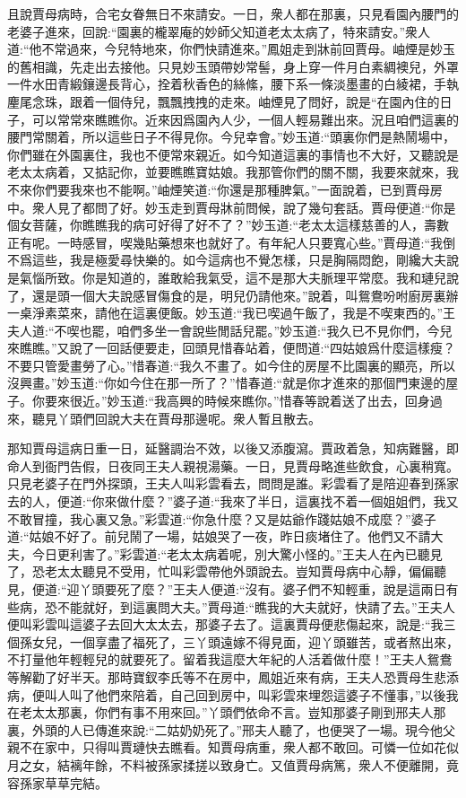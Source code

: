 \begin{parag}
    且說賈母病時，合宅女眷無日不來請安。一日，衆人都在那裏，只見看園內腰門的老婆子進來，回說:“園裏的櫳翠庵的妙師父知道老太太病了，特來請安。”衆人道:“他不常過來，今兒特地來，你們快請進來。”鳳姐走到牀前回賈母。岫煙是妙玉的舊相識，先走出去接他。只見妙玉頭帶妙常髻，身上穿一件月白素綢襖兒，外罩一件水田青緞鑲邊長背心，拴着秋香色的絲絛，腰下系一條淡墨畫的白綾裙，手執麈尾念珠，跟着一個侍兒，飄飄拽拽的走來。岫煙見了問好，說是“在園內住的日子，可以常常來瞧瞧你。近來因爲園內人少，一個人輕易難出來。況且咱們這裏的腰門常關着，所以這些日子不得見你。今兒幸會。”妙玉道:“頭裏你們是熱鬧場中，你們雖在外園裏住，我也不便常來親近。如今知道這裏的事情也不大好，又聽說是老太太病着，又掂記你，並要瞧瞧寶姑娘。我那管你們的關不關，我要來就來，我不來你們要我來也不能啊。”岫煙笑道:“你還是那種脾氣。”一面說着，已到賈母房中。衆人見了都問了好。妙玉走到賈母牀前問候，說了幾句套話。賈母便道:“你是個女菩薩，你瞧瞧我的病可好得了好不了？”妙玉道:“老太太這樣慈善的人，壽數正有呢。一時感冒，喫幾貼藥想來也就好了。有年紀人只要寬心些。”賈母道:“我倒不爲這些，我是極愛尋快樂的。如今這病也不覺怎樣，只是胸隔悶飽，剛纔大夫說是氣惱所致。你是知道的，誰敢給我氣受，這不是那大夫脈理平常麼。我和璉兒說了，還是頭一個大夫說感冒傷食的是，明兒仍請他來。”說着，叫鴛鴦吩咐廚房裏辦一桌淨素菜來，請他在這裏便飯。妙玉道:“我已喫過午飯了，我是不喫東西的。”王夫人道:“不喫也罷，咱們多坐一會說些閒話兒罷。”妙玉道:“我久已不見你們，今兒來瞧瞧。”又說了一回話便要走，回頭見惜春站着，便問道:“四姑娘爲什麼這樣瘦？不要只管愛畫勞了心。”惜春道:“我久不畫了。如今住的房屋不比園裏的顯亮，所以沒興畫。”妙玉道:“你如今住在那一所了？”惜春道:“就是你才進來的那個門東邊的屋子。你要來很近。”妙玉道:“我高興的時候來瞧你。”惜春等說着送了出去，回身過來，聽見丫頭們回說大夫在賈母那邊呢。衆人暫且散去。
\end{parag}


\begin{parag}
    那知賈母這病日重一日，延醫調治不效，以後又添腹瀉。賈政着急，知病難醫，即命人到衙門告假，日夜同王夫人親視湯藥。一日，見賈母略進些飲食，心裏稍寬。只見老婆子在門外探頭，王夫人叫彩雲看去，問問是誰。彩雲看了是陪迎春到孫家去的人，便道:“你來做什麼？”婆子道:“我來了半日，這裏找不着一個姐姐們，我又不敢冒撞，我心裏又急。”彩雲道:“你急什麼？又是姑爺作踐姑娘不成麼？”婆子道:“姑娘不好了。前兒鬧了一場，姑娘哭了一夜，昨日痰堵住了。他們又不請大夫，今日更利害了。”彩雲道:“老太太病着呢，別大驚小怪的。”王夫人在內已聽見了，恐老太太聽見不受用，忙叫彩雲帶他外頭說去。豈知賈母病中心靜，偏偏聽見，便道:“迎丫頭要死了麼？”王夫人便道:“沒有。婆子們不知輕重，說是這兩日有些病，恐不能就好，到這裏問大夫。”賈母道:“瞧我的大夫就好，快請了去。”王夫人便叫彩雲叫這婆子去回大太太去，那婆子去了。這裏賈母便悲傷起來，說是:“我三個孫女兒，一個享盡了福死了，三丫頭遠嫁不得見面，迎丫頭雖苦，或者熬出來，不打量他年輕輕兒的就要死了。留着我這麼大年紀的人活着做什麼！”王夫人鴛鴦等解勸了好半天。那時寶釵李氏等不在房中，鳳姐近來有病，王夫人恐賈母生悲添病，便叫人叫了他們來陪着，自己回到房中，叫彩雲來埋怨這婆子不懂事，”以後我在老太太那裏，你們有事不用來回。”丫頭們依命不言。豈知那婆子剛到邢夫人那裏，外頭的人已傳進來說:“二姑奶奶死了。”邢夫人聽了，也便哭了一場。現今他父親不在家中，只得叫賈璉快去瞧看。知賈母病重，衆人都不敢回。可憐一位如花似月之女，結褵年餘，不料被孫家揉搓以致身亡。又值賈母病篤，衆人不便離開，竟容孫家草草完結。
\end{parag}


